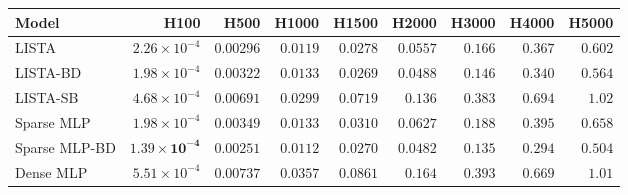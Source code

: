 \begin{tabular}{@{}l r r r r r r r r@{}}
\toprule
Model & H100 & H500 & H1000 & H1500 & H2000 & H3000 & H4000 & H5000 \\
\midrule
LISTA & $2.26{\times}10^{-4}$ & $0.00296$ & $0.0119$ & $0.0278$ & $0.0557$ & $0.166$ & $0.367$ & $0.602$ \\
LISTA-BD & $1.98{\times}10^{-4}$ & $0.00322$ & $0.0133$ & $\mathbf{0.0269}$ & $0.0488$ & $0.146$ & $0.340$ & $0.564$ \\
LISTA-SB & $4.68{\times}10^{-4}$ & $0.00691$ & $0.0299$ & $0.0719$ & $0.136$ & $0.383$ & $0.694$ & $1.02$ \\
Sparse MLP & $1.98{\times}10^{-4}$ & $0.00349$ & $0.0133$ & $0.0310$ & $0.0627$ & $0.188$ & $0.395$ & $0.658$ \\
Sparse MLP-BD & $\mathbf{1.39{\times}10^{-4}}$ & $\mathbf{0.00251}$ & $\mathbf{0.0112}$ & $0.0270$ & $\mathbf{0.0482}$ & $\mathbf{0.135}$ & $\mathbf{0.294}$ & $\mathbf{0.504}$ \\
Dense MLP & $5.51{\times}10^{-4}$ & $0.00737$ & $0.0357$ & $0.0861$ & $0.164$ & $0.393$ & $0.669$ & $1.01$ \\
\bottomrule
\end{tabular}
